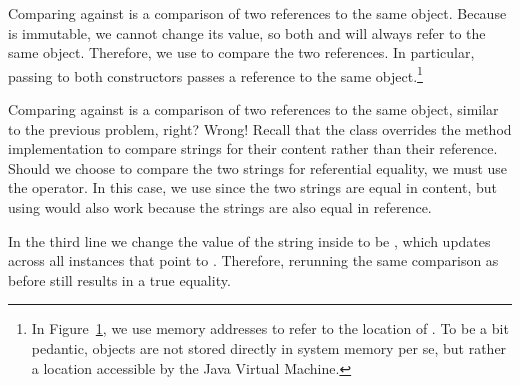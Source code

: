 Comparing  against  is a comparison of two references to the same object. Because  is immutable, we cannot change its value, so both  and  will always refer to the same object. Therefore, we use  to compare the two references. In particular, passing  to both constructors passes a reference to the same object.\footnote{In Figure~\ref{fig:memoryref}, we use memory addresses to refer to the location of . To be a bit pedantic, objects are not stored directly in system memory per se, but rather a location accessible by the Java Virtual Machine.}
\begin{figure}[H]
\centering
{}
\label{fig:memoryref}
\end{figure}

Comparing  against  is a comparison of two references to the same object, similar to the previous problem, right? Wrong! Recall that the  class overrides the  method implementation to compare strings for their content rather than their reference. Should we choose to compare the two strings for referential equality, we must use the \ttt{==} operator. In this case, we use  since the two strings are equal in content, but using \ttt{==} would also work because the strings are also equal in reference.

In the third line we change the value of the string inside  to be , which updates across all instances that point to . Therefore, rerunning the same comparison as before still results in a true equality.

